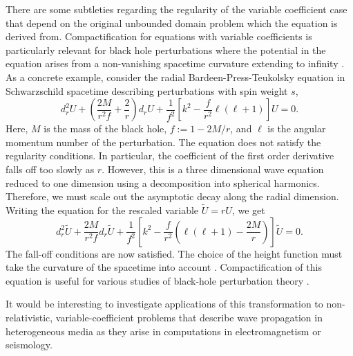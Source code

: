 \documentclass[onefignum,onetabnum]{siamart190516}
\begin{document}
There are some subtleties regarding the regularity of the variable coefficient case that depend on the original unbounded domain problem which the equation is derived from. Compactification for equations with variable coefficients is particularly relevant for black hole perturbations where the potential in the equation arises from a non-vanishing spacetime curvature extending to infinity \cite{regge1957stability}. As a concrete example, consider the radial Bardeen-Press-Teukolsky equation in Schwarzschild spacetime describing perturbations with spin weight $s$,
\[ d_r^2 U + \left(\frac{2M}{r^2 f}+\frac{2}{r}\right) d_r U + \frac{1}{f^2} \left[k^2- \frac{f}{r^2} \ell (\ell+1) \right] U = 0.\] 
Here, $M$ is the mass of the black hole, $f:=1-2M/r$, and $\ell$ is the angular momentum number of the perturbation. The equation does not satisfy the regularity conditions. In particular, the coefficient of the first order derivative falls off too slowly as $r$. However, this is a three dimensional wave equation reduced to one dimension using a decomposition into spherical harmonics. Therefore, we must scale out the asymptotic decay along the radial dimension. Writing the equation for the rescaled variable $\tilde{U} = r U $, we get
\[ d_r^2 \tilde{U} + \frac{2M}{r^2 f} d_r \tilde{U} + \frac{1}{f^2} \left[k^2- \frac{f}{r^2} \left(\ell (\ell+1)-\frac{2M}{r}\right) \right] \tilde{U} = 0. \]
The fall-off conditions are now satisfied. The choice of the height function must take the curvature of the spacetime into account \cite{ZengFramework, macedo2018hyperboloidal}. Compactification of this equation is useful for various studies of black-hole perturbation theory \cite{Zenginoglu09, jaramillo2021pseudospectrum, macedo2022hyperboloidal}. 

It would be interesting to investigate applications of this transformation to non-relativistic, variable-coefficient problems that describe wave propagation in heterogeneous media as they arise in computations in electromagnetism or seismology. 
\end{document}
